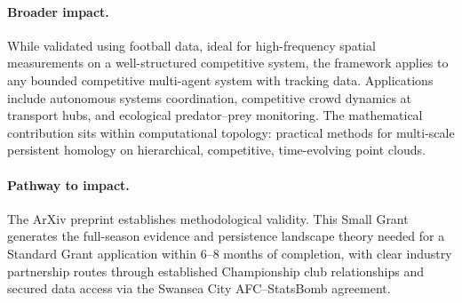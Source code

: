 \paragraph{Broader impact.}
While validated using football data, ideal for high-frequency spatial measurements on a well-structured competitive system, the framework applies to any bounded competitive multi-agent system with tracking data. Applications include autonomous systems coordination, competitive crowd dynamics at transport hubs, and ecological predator--prey monitoring. The mathematical contribution sits within computational topology: practical methods for multi-scale persistent homology on hierarchical, competitive, time-evolving point clouds.

\paragraph{Pathway to impact.}
The ArXiv preprint \citep{Brown2026} establishes methodological validity. This Small Grant generates the full-season evidence and persistence landscape theory needed for a Standard Grant application within 6--8 months of completion, with clear industry partnership routes through established Championship club relationships and secured data access via the Swansea City AFC--StatsBomb agreement.
